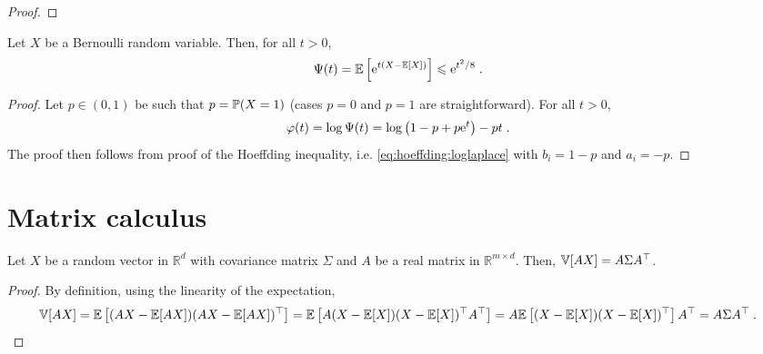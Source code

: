 \begin{proof}
\end{proof}

\begin{shaded}
\begin{lemma}
\label{lem:bernoulli:bound}
Let $X$ be a Bernoulli random variable. Then, for all $t>0$,
\[
\Psi(t) = \mathbb{E}\left[\mathrm{e}^{t\left(X-\mathbb{E}[X]\right)}\right] \leqslant \mathrm{e}^{t^2/8}\;.
\]
\end{lemma}
\end{shaded}

\begin{proof}
Let $p\in(0,1)$ be such that $p = \mathbb{P}(X=1)$ (cases $p=0$ and $p=1$ are straightforward). For all $t>0$,
\[
\varphi(t) = \log \Psi(t) = \log\left(1-p+p\mathrm{e}^t\right) - pt\;.
\]
The proof then follows from proof of the Hoeffding inequality, i.e. \eqref{eq:hoeffding:loglaplace} with $b_i =1-p$ and $a_i = -p$.
\end{proof}



\section{Matrix calculus}
\begin{shaded}
\begin{lemma}
Let $X$ be a random vector in $\mathbb{R}^d$ with covariance matrix $\Sigma$ and $A$ be a real matrix in $\mathbb{R}^{m\times d}$. Then, $\mathbb{V}[AX] = A\Sigma A^\top$.
\end{lemma}
\end{shaded}
\begin{proof}
By definition, using the linearity of the expectation,
$$
\mathbb{V}[AX] = \mathbb{E}\left[(AX - \mathbb{E}[AX])(AX - \mathbb{E}[AX])^\top\right] = \mathbb{E}\left[A(X - \mathbb{E}[X])(X - \mathbb{E}[X])^\top A^\top\right] = A\mathbb{E}\left[(X - \mathbb{E}[X])(X - \mathbb{E}[X])^\top \right]A^\top = A\Sigma A^\top\;.
$$
\end{proof}

